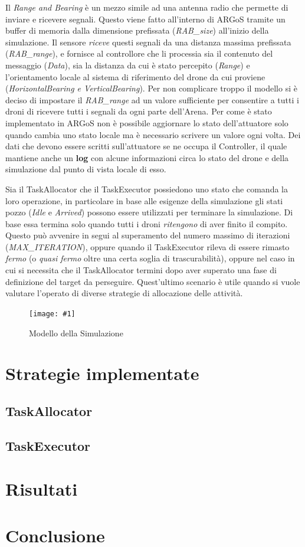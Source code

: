 \documentclass[a4paper,11pt,oneside, table]{article}
\newcommand{\putimage}[4] {
	\begin{figure}[H]
	    \centering
	    \texttt{[image: \#1]}
	    \caption{#2}\label{#3}
	\end{figure}
}
\begin{document}
Il \textit{Range and Bearing} \`e un mezzo simile ad una antenna radio che permette di inviare e ricevere segnali. Questo viene fatto all'interno di ARGoS tramite un buffer di memoria dalla dimensione prefissata (\textit{RAB\_size}) all'inizio della simulazione.
Il sensore \textit{riceve} questi segnali da una distanza massima prefissata (\textit{RAB\_range}), e fornisce al controllore che li processia sia il contenuto del messaggio (\textit{Data}), sia la distanza da cui \`e stato percepito (\textit{Range}) e l'orientamento locale al sistema di riferimento del drone da cui proviene (\textit{HorizontalBearing e VerticalBearing}).
Per non complicare troppo il modello si \`e deciso di impostare il \textit{RAB\_range} ad un valore sufficiente per consentire a tutti i droni di ricevere tutti i segnali da ogni parte dell'Arena.
Per come \`e stato implementato in ARGoS non \`e possibile aggiornare lo stato dell'attuatore solo quando cambia uno stato locale ma \`e necessario scrivere un valore ogni volta. %
Dei dati che devono essere scritti sull'attuatore se ne occupa il Controller, il quale mantiene anche un \textbf{log} con alcune informazioni circa lo stato del drone e della simulazione dal punto di vista locale di esso.

Sia il TaskAllocator che il TaskExecutor possiedono uno stato che comanda la loro operazione, in particolare in base alle esigenze della simulazione gli stati pozzo (\textit{Idle} e \textit{Arrived}) possono essere utilizzati per terminare la simulazione.
Di base essa termina solo quando tutti i droni \textit{ritengono} di aver finito il compito. Questo pu\`o avvenire in segui al superamento del numero massimo di iterazioni (\textit{MAX\_ITERATION}), oppure quando il TaskExecutor rileva di essere rimasto \textit{fermo} (o \textit{quasi fermo} oltre una certa soglia di trascurabilit\`a), oppure nel caso in cui si necessita che il TaskAllocator termini dopo aver superato una fase di definizione del target da perseguire.
Quest'ultimo scenario \`e utile quando si vuole valutare l'operato di diverse strategie di allocazione delle attivit\`a.

\putimage{images/simulation-model.png}{Modello della Simulazione}{png:simulation-model}{0.99}

\section{Strategie implementate}

\subsection{TaskAllocator}

\subsection{TaskExecutor}

\section{Risultati}

\section{Conclusione}
\end{document}
